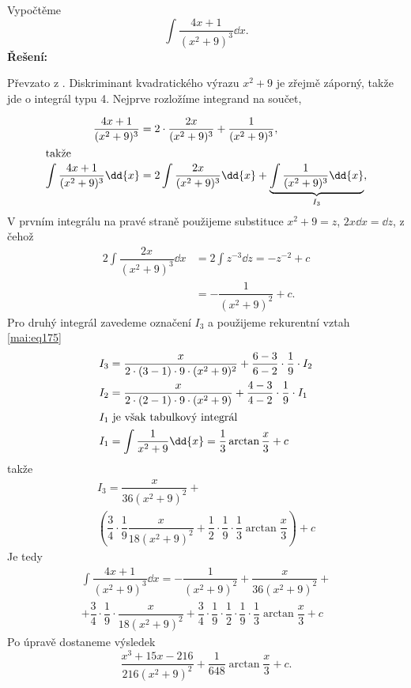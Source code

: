 \begin{mdframed}[style=mdexam]
  \begin{example}\label{MAI:exam141}
    Vypočtěme
    \begin{equation*}
      \int\dfrac{4x + 1}{(x^2 + 9)^3}\dd{x}.
    \end{equation*}
    \noindent\textbf{Řešení:}

    Převzato z \cite[s.~76]{Knichal}. Diskriminant kvadratického výrazu \(x^2+9\) je zřejmě záporný,
    takže jde o integrál typu 4. Nejprve rozložíme integrand na součet,

    \begin{align*}
      \dfrac{4x+1}{(x^2+9)^3} 
        &= 2\cdot\dfrac{2x}{(x^2+9)^3} + \dfrac{1}{(x^2+9)^3},             \\
      \shortintertext{takže}
      \int\dfrac{4x+1}{(x^2+9)^3}\dd{x} 
        &= 2\int\dfrac{2x}{(x^2+9)^3}\dd{x} + \underbrace{\int\dfrac{1}{(x^2+9)^3}\dd{x}}_{I_3},
    \end{align*}
    V prvním integrálu na pravé straně použijeme substituce \(x^2+9=z\), \(2x\dd{x} = \dd{z}\), z
    čehož 
    \begin{align*}
      2\int\dfrac{2x}{(x^2+9)^3}\dd{x} 
        &= 2\int z^{-3}\dd{z} = -z^{-2} + c  \\
        &= -\dfrac{1}{(x^2+9)^2} + c.
    \end{align*}  
    Pro druhý integrál zavedeme označení \(I_3\) a použijeme rekurentní vztah \ref{mai:eq175}
    \begin{align*}
      I_3 &= \dfrac{x}{2\cdot(3-1)\cdot9\cdot(x^2+9)^2}+\dfrac{6-3}{6-2}\cdot\dfrac{1}{9}\cdot I_2\\
      I_2 &= \dfrac{x}{2\cdot(2-1)\cdot9\cdot(x^2+9)  }+\dfrac{4-3}{4-2}\cdot\dfrac{1}{9}\cdot I_1\\
      \shortintertext{\(I_1\) je však tabulkový integrál}
      I_1 &= \int\dfrac{1}{x^2+9}\dd{x} = \dfrac{1}{3}\arctan\dfrac{x}{3} + c
    \end{align*}
    takže
    \begin{multline*}
      I_3 = 
        \dfrac{x}{36(x^2+9)^2} +        \\
          \left(
            \dfrac{3}{4}\cdot\dfrac{1}{9}\dfrac{x}{18(x^2+9)^2} + 
            \dfrac{1}{2}\cdot\dfrac{1}{9}\cdot\dfrac{1}{3}\arctan\dfrac{x}{3}
          \right) + c
    \end{multline*}
    Je tedy
    \begin{multline*}
      \int\dfrac{4x + 1}{(x^2 + 9)^3}\dd{x} = -\dfrac{1}{(x^2+9)^2} + \dfrac{x}{36(x^2+9)^2} +  \\
      + \dfrac{3}{4}\cdot\dfrac{1}{9}\cdot\dfrac{x}{18(x^2+9)^2}
      + \dfrac{3}{4}\cdot\dfrac{1}{9}\cdot\dfrac{1}{2}\cdot
        \dfrac{1}{9}\cdot\dfrac{1}{3}\arctan\dfrac{x}{3} + c
    \end{multline*}
    Po úpravě dostaneme výsledek
    \begin{equation*}
      \dfrac{x^3+15x-216}{216(x^2+9)^2} + \dfrac{1}{648}\arctan\dfrac{x}{3} + c.
    \end{equation*}
  \end{example}
\end{mdframed}